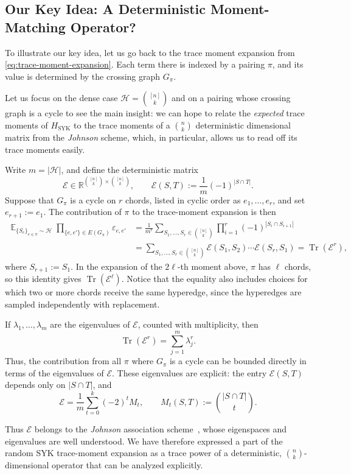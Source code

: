 \documentclass
[11pt,letterpaper]
{article}
\theoremstyle{definition}
\newcommand{\Tr}{\operatorname{Tr}}
\newcommand{\R}{{\mathbb R}}
\newcommand{\eps}{\varepsilon}
\newcommand{\cE}{{\mathcal E}}
\newcommand{\1}{\mathbf{1}}
\newcommand{\cH}{\mathcal H}
\DeclareMathOperator*{\E}{\mathbb{E}}
\newcommand{\syk}{\operatorname{SYK}}
\begin{document}
\subsection{Our Key Idea: A Deterministic Moment-Matching Operator?}
\label{sec:baby-johnson} To illustrate our key idea, let us go back to the trace moment expansion from \eqref{eq:trace-moment-expansion}. Each term there is indexed by a pairing $\pi$, and its value is determined by the crossing graph $G_\pi$.  

Let us focus on the dense case $\cH=\binom{[n]}{k}$ and on a pairing whose crossing graph is a cycle to see the main insight: we can hope to relate the \emph{expected} trace moments of $H_{\syk}$ to the trace moments of a ${n \choose k}$ deterministic dimensional matrix from the \emph{Johnson} scheme, which, in particular, allows us to read off its trace moments easily. 

Write $m=|\cH|$, and define the deterministic matrix
\[
    \cE\in\R^{\binom{[n]}{k}\times\binom{[n]}{k}},
    \qquad
    \cE(S,T):=\frac{1}{m}(-1)^{|S\cap T|}.
\]
Suppose that $G_\pi$ is a cycle on $r$ chords, listed in cyclic order as $e_1,\ldots,e_r$, and set $e_{r+1}:=e_1$. The contribution of $\pi$ to the trace-moment expansion is then
\begin{align*}
    \E_{\{S_e\}_{e\in\pi}\sim\cH}
    \prod_{\{e,e'\}\in E(G_\pi)}\eps_{e,e'}
    &=
    \frac{1}{m^r}
    \sum_{S_1,\ldots,S_r\in\binom{[n]}{k}}
    \prod_{i=1}^r(-1)^{|S_i\cap S_{i+1}|}\\
    &=
    \sum_{S_1,\ldots,S_r\in\binom{[n]}{k}}
    \cE(S_1,S_2)\cdots \cE(S_r,S_1)
    =
    \Tr(\cE^r),
\end{align*}
where $S_{r+1}:=S_1$. In the expansion of the $2\ell$-th moment above, $\pi$ has $\ell$ chords, so this identity gives $\Tr(\cE^\ell)$. Notice that the equality also includes choices for which two or more chords receive the same hyperedge, since the hyperedges are sampled independently with replacement.

If $\lambda_1,\ldots,\lambda_m$ are the eigenvalues of $\cE$, counted with multiplicity, then
\[
    \Tr(\cE^r)=\sum_{j=1}^m\lambda_j^r.
\]
Thus, the contribution from all $\pi$ where $G_{\pi}$ is a cycle can be bounded directly in terms of the eigenvalues of $\cE$. These eigenvalues are explicit: the entry $\cE(S,T)$ depends only on $|S\cap T|$, and
\[
    \cE=\frac{1}{m}\sum_{t=0}^k(-2)^tM_t,
    \qquad
    M_t(S,T):=\binom{|S\cap T|}{t}.
\]

Thus $\cE$ belongs to the \emph{Johnson} association scheme~\cite{Godsil10}, whose eigenspaces and eigenvalues are well understood. We have therefore expressed a part of the random SYK trace-moment expansion as a trace power of a deterministic, $\binom{n}{k}$-dimensional operator that can be analyzed explicitly.
\end{document}
